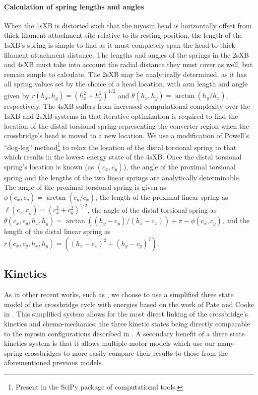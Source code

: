 \documentclass[]{article}
\begin{document}

\paragraph{Calculation of spring lengths and angles} %
When the 1sXB is distorted such that the myosin head is horizontally offset from thick filament attachment site relative to its resting position, the length of the 1sXB's spring is simple to find as it must completely span the head to thick filament attachment distance.
The lengths and angles of the springs in the 2sXB and 4sXB must take into account the radial distance they must cover as well, but remain simple to calculate.
The 2sXB may be analytically determined, as it has all spring values set by the choice of a head location, with arm length and angle given by $r(h_x, h_y)=(h_x^2 + h_y^2)^{1/2}$ and $\theta(h_x, h_y)=\arctan(h_y/h_x)$, respectively.
The 4sXB suffers from increased computational complexity over the 1sXB and 2sXB systems in that iterative optimization is required to find the location of the distal torsional spring representing the converter region when the crossbridge's head is moved to a new location.
We use a modification of Powell's ``dog-leg'' method\footnote{Present in the SciPy package of computational tools.} to relax the location of the distal torsional spring to that which results in the lowest energy state of the 4sXB.
Once the distal torsional spring's location is known (as $(c_x, c_y)$), the angle of the proximal torsional spring and the lengths of the two linear springs are analytically determinable.
The angle of the proximal torsional spring is given as $\phi(c_x, c_y)=\arctan(c_y/c_x)$, the length of the proximal linear spring as $\ell(c_x, c_y)=(c_x^2 + c_y^2)^{1/2}$, the angle of the distal torsional spring as $\theta(c_x, c_y, h_x, h_y) = \arctan((h_y-c_y)/(h_x-c_x)) + \pi - \phi(c_x, c_y)$, and the length of the distal linear spring as $r(c_x, c_y, h_x, h_y)=((h_x-c_x)^2 + (h_y-c_y)^2)$.


\subsection*{Kinetics} %
As in other recent works, such as \citet{Tanner:2007:pe115}, we choose to use a simplified three state model of the crossbridge cycle with energies based on the work of Pate and Cooke in \citet{Pate:1989:p181}. 
This simplified system allows for the most direct linking of the crossbridge's kinetics and chemo-mechanics; the three kinetic states being directly comparable to the myosin configurations described in \citet{Houdusse:2000:p11238}.
A secondary benefit of a three state kinetics system is that it allows multiple-motor models which use our many-spring crossbridges to more easily compare their results to those from the aforementioned previous models.
\end{document}
